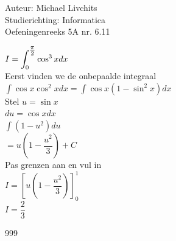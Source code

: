 \documentclass[a4paper]{article}
\newcommand{\dint}{\displaystyle\int}
\begin{document}
  
\noindent \large Auteur: Michael Livchits \\
\noindent \large Studierichting: Informatica\\
\noindent \large Oefeningenreeks 5A nr. 6.11\\

\medskip

\normalsize

$I = \displaystyle\dint_{0}^{\tfrac{\pi}{2}} \cos^3xdx$\\

Eerst vinden we de onbepaalde integraal\\

$\displaystyle\int \cos x\cos^2xdx = \displaystyle\int \cos x(1-\sin^2x)dx$\\

Stel $u = \sin x$\\

$du = \cos xdx$\\

$\displaystyle\int (1-u^2)du$\\

$= u\left(1-\dfrac{u^2}{3}\right) + C$\\

Pas grenzen aan en vul in\\

$I = \left[u\left(1-\dfrac{u^2}{3}\right)\right]_{0}^{1}$\\

$I = \dfrac{2}{3}$

\begin{thebibliography}{999}
\end{thebibliography}
\end{document}
